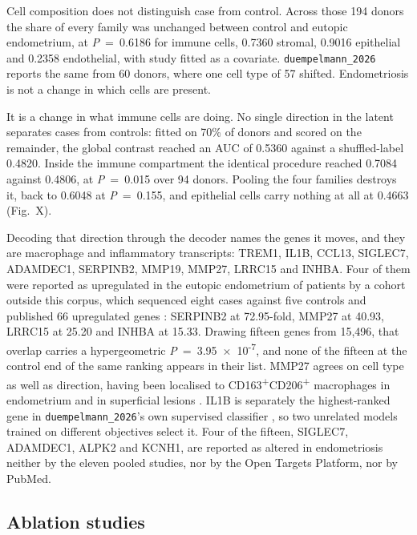 \documentclass[11pt]{article}
\begin{document}
Cell composition does not distinguish case from control. Across those 194
donors the share of every family was unchanged between control and eutopic
endometrium, at \textit{P}~=~0.6186 for immune cells, 0.7360 stromal, 0.9016
epithelial and 0.2358 endothelial, with study fitted as a covariate.
\texttt{duempelmann\_2026} reports the same from 60 donors, where one cell
type of 57 shifted. Endometriosis is not a change in which cells are
present.

It is a change in what immune cells are doing. No single direction in the
latent separates cases from controls: fitted on 70\% of donors and scored on
the remainder, the global contrast reached an AUC of 0.5360 against a
shuffled-label 0.4820. Inside the immune compartment the identical procedure
reached 0.7084 against 0.4806, at \textit{P}~=~0.015 over 94 donors. Pooling the
four families destroys it, back to 0.6048 at \textit{P}~=~0.155, and epithelial
cells carry nothing at all at 0.4663 (Fig.~X).

Decoding that direction through the decoder names the genes it moves, and
they are macrophage and inflammatory transcripts: TREM1, IL1B, CCL13,
SIGLEC7, ADAMDEC1, SERPINB2, MMP19, MMP27, LRRC15 and INHBA. Four of them were reported
as upregulated in the eutopic endometrium of patients by a cohort outside
this corpus, which sequenced eight cases against five controls and published
66 upregulated genes \citep{zhao2017transcriptome}: SERPINB2 at 72.95-fold,
MMP27 at 40.93, LRRC15 at 25.20 and INHBA at 15.33. Drawing fifteen genes
from 15,496, that overlap carries a hypergeometric
\textit{P}~=~3.95~×~10\textsuperscript{-7}, and none of the fifteen at the control end of the
same ranking appears in their list. MMP27 agrees on cell type as well as
direction, having been localised to CD163\textsuperscript{+}CD206\textsuperscript{+} macrophages in
endometrium and in superficial lesions \citep{cominelli2014mmp27}. IL1B is
separately the highest-ranked gene in \texttt{duempelmann\_2026}'s own
supervised classifier \citep{duempelmann2026endometrium}, so two unrelated
models trained on different objectives select it. Four of the fifteen, SIGLEC7, ADAMDEC1, ALPK2 and
KCNH1, are reported as altered in endometriosis neither by the eleven
pooled studies, nor by the Open Targets Platform, nor by PubMed.

\subsection*{Ablation studies}
\end{document}
